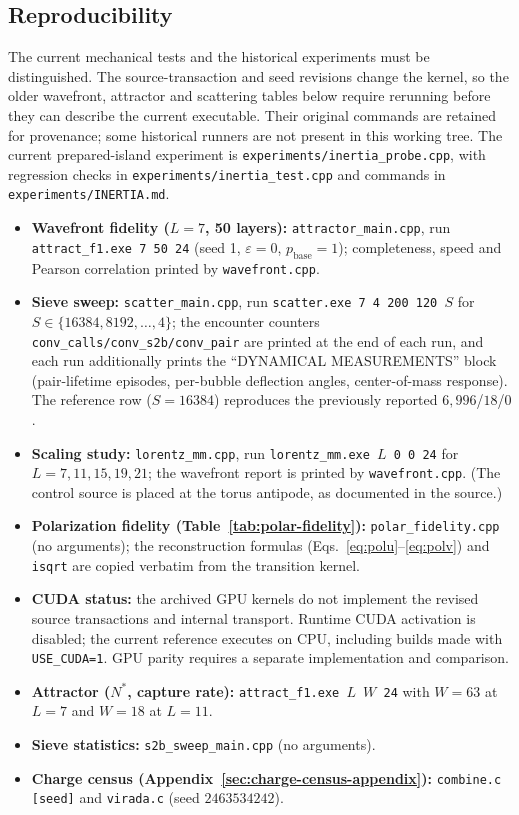 \documentclass{ijuc}
\begin{document}
\subsection{Reproducibility}
The current mechanical tests and the historical experiments must be distinguished. The source-transaction and seed revisions change the kernel, so the older wavefront, attractor and scattering tables below require rerunning before they can describe the current executable. Their original commands are retained for provenance; some historical runners are not present in this working tree. The current prepared-island experiment is \texttt{experiments/inertia\_probe.cpp}, with regression checks in \texttt{experiments/inertia\_test.cpp} and commands in \texttt{experiments/INERTIA.md}.
\begin{itemize}
\item \textbf{Wavefront fidelity ($L=7$, 50 layers):} \texttt{attractor\_main.cpp}, run \texttt{attract\_f1.exe 7 50 24} (seed 1, $\varepsilon=0$, $p_{\mathrm{base}}=1$); completeness, speed and Pearson correlation printed by \texttt{wavefront.cpp}.
\item \textbf{Sieve sweep:} \texttt{scatter\_main.cpp}, run \texttt{scatter.exe 7 4 200 120 $S$} for $S\in\{16384,8192,\dots,4\}$; the encounter counters \texttt{conv\_calls/conv\_s2b/conv\_pair} are printed at the end of each run, and each run additionally prints the ``DYNAMICAL MEASUREMENTS'' block (pair-lifetime episodes, per-bubble deflection angles, center-of-mass response).  The reference row ($S=16384$) reproduces the previously reported $6{,}996$/$18$/$0$.
\item \textbf{Scaling study:} \texttt{lorentz\_mm.cpp}, run \texttt{lorentz\_mm.exe $L$ 0 0 24} for $L=7,11,15,19,21$; the wavefront report is printed by \texttt{wavefront.cpp}.  (The control source is placed at the torus antipode, as documented in the source.)
\item \textbf{Polarization fidelity (Table~\ref{tab:polar-fidelity}):} \texttt{polar\_fidelity.cpp} (no arguments); the reconstruction formulas (Eqs.~\eqref{eq:polu}--\eqref{eq:polv}) and \texttt{isqrt} are copied verbatim from the transition kernel.
\item \textbf{CUDA status:} the archived GPU kernels do not implement the revised source transactions and internal transport. Runtime CUDA activation is disabled; the current reference executes on CPU, including builds made with \texttt{USE\_CUDA=1}. GPU parity requires a separate implementation and comparison.
\item \textbf{Attractor ($N^{*}$, capture rate):} \texttt{attract\_f1.exe $L$ $W$ 24} with $W=63$ at $L=7$ and $W=18$ at $L=11$.
\item \textbf{Sieve statistics:} \texttt{s2b\_sweep\_main.cpp} (no arguments).
\item \textbf{Charge census (Appendix~\ref{sec:charge-census-appendix}):} \texttt{combine.c [seed]} and \texttt{virada.c} (seed $2463534242$).
\end{itemize}
\end{document}
